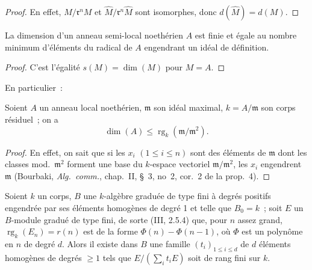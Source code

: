 
\begin{proof}
En effet, $M/\mathfrak{r}^nM$ et
$\widehat{M}/\mathfrak{r}^n\widehat{M}$ sont isomorphes, donc
$d(\widehat{M})=d(M)$.
\end{proof}

\begin{corollary}[16.2.5]
\label{0.16.2.5-fr}
La dimension d'un anneau semi-local noethérien $A$ est finie et égale au
nombre minimum d'éléments du radical de $A$ engendrant un idéal de définition.
\end{corollary}

\begin{proof}
C'est l'égalité $s(M)=\dim(M)$ pour $M=A$.
\end{proof}

En particulier~:

\begin{corollary}[16.2.6]
\label{0.16.2.6-fr}
Soient $A$ un anneau local noethérien, $\mathfrak{m}$ son idéal maximal,
$k=A/\mathfrak{m}$ son corps résiduel~; on a
\begin{equation}
\label{0.16.2.6.1-fr}
\tag{16.2.6.1}
  \dim(A)\leq\operatorname{rg}_k(\mathfrak{m}/\mathfrak{m}^2).
\end{equation}
\end{corollary}

\begin{proof}
En effet, on sait que si les $x_i$ $(1\leq i\leq n)$ sont des éléments de
$\mathfrak{m}$ dont les classes mod.~$\mathfrak{m}^2$ forment une base du
$k$-espace vectoriel $\mathfrak{m}/\mathfrak{m}^2$, les $x_i$ engendrent
$\mathfrak{m}$ (Bourbaki, \emph{Alg.~comm.}, chap.~II, \S~3, no~2, cor.~2 de
la prop.~4).
\end{proof}

\begin{proposition}[16.2.7]
\label{0.16.2.7-fr}
Soient $k$ un corps, $B$ une $k$-algèbre graduée de type fini à degrés
positifs engendrée par ses éléments homogènes de degré 1 et telle que $B_0=k$~;
soit $E$ un $B$-module gradué de type fini, de sorte (III, 2.5.4) que, pour $n$
assez grand, $\operatorname{rg}_k(E_n)=r(n)$ est de la forme
$\Phi(n)-\Phi(n-1)$, où $\Phi$ est un polynôme en $n$ de degré $d$. Alors il
existe dans $B$ une famille $(t_i)_{1\leq i\leq d}$ de $d$ éléments homogènes
de degrés $\geq1$ tels que $E/(\sum_i t_iE)$ soit de rang fini sur $k$.
\end{proposition}

